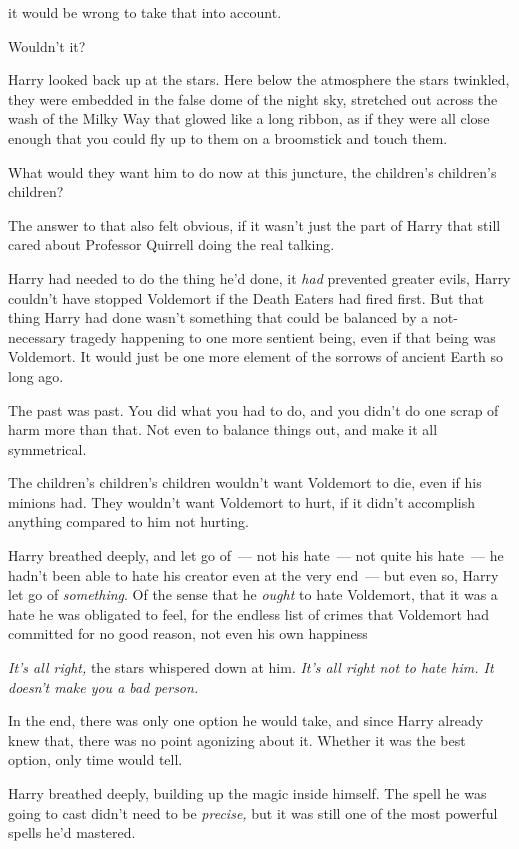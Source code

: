 {\el} it would be wrong to take that into account.

Wouldn't it?

Harry looked back up at the stars. Here below the atmosphere the stars
twinkled, they were embedded in the false dome of the night sky, stretched out
across the wash of the Milky Way that glowed like a long ribbon, as if they
were all close enough that you could fly up to them on a broomstick and touch
them.

What would they want him to do now at this juncture, the children's children's
children?

The answer to that also felt obvious, if it wasn't just the part of Harry that
still cared about Professor Quirrell doing the real talking.

Harry had needed to do the thing he'd done, it \emph{had} prevented greater
evils, Harry couldn't have stopped Voldemort if the Death Eaters had fired
first. But that thing Harry had done wasn't something that could be balanced by
a not-necessary tragedy happening to one more sentient being, even if that
being was Voldemort. It would just be one more element of the sorrows of
ancient Earth so long ago.

The past was past. You did what you had to do, and you didn't do one scrap of
harm more than that. Not even to balance things out, and make it all
symmetrical.

The children's children's children wouldn't want Voldemort to die, even if his
minions had. They wouldn't want Voldemort to hurt, if it didn't accomplish
anything compared to him not hurting.

Harry breathed deeply, and let go of~--- not his hate~--- not quite his hate~--- he
hadn't been able to hate his creator even at the very end~--- but even so, Harry
let go of \emph{something}. Of the sense that he \emph{ought} to hate
Voldemort, that it was a hate he was obligated to feel, for the endless list of
crimes that Voldemort had committed for no good reason, not even his own
happiness{\el}

\emph{It's all right,} the stars whispered down at him. \emph{It's all right
not to hate him. It doesn't make you a bad person.}

In the end, there was only one option he would take, and since Harry already
knew that, there was no point agonizing about it. Whether it was the best
option, only time would tell.

Harry breathed deeply, building up the magic inside himself. The spell he was
going to cast didn't need to be \emph{precise,} but it was still one of the
most powerful spells he'd mastered.

